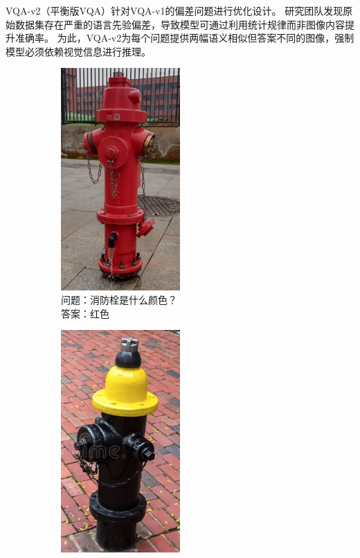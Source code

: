 VQA-v2\cite{goyal2017making}（平衡版VQA）针对VQA-v1的偏差问题进行优化设计。
研究团队发现原始数据集存在严重的语言先验偏差，导致模型可通过利用统计规律而非图像内容提升准确率。
为此，VQA-v2为每个问题提供两幅语义相似但答案不同的图像，强制模型必须依赖视觉信息进行推理。
\begin{figure}[h]
    \centering
    \begin{subfigure}[b]{0.45\textwidth}
        \centering
        \includegraphics[width=0.5\textwidth, keepaspectratio]{figures/hydrant-a.png}
        \caption*{\footnotesize 问题：消防栓是什么颜色？\\答案：红色}
        \label{fig:example-from-vqa-v2-1}
    \end{subfigure}
    \hfill
    \begin{subfigure}[b]{0.45\textwidth}
        \centering
        \includegraphics[width=0.5\textwidth, keepaspectratio]{figures/hydrant-b.png}

\end{subfigure}
\end{figure}
